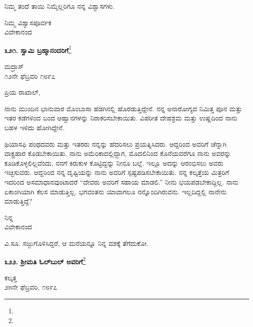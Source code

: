 ನಿಮ್ಮ ತಂದೆ ತಾಯಿ\enginline{-} ನಿಮ್ಮೆಲ್ಲರಿಗೂ ನನ್ನ ವಿಶ್ವಾಸಗಳು.

\vspace{-0.5cm}

{\flushright
ನಿಮ್ಮ ವಿಶ್ವಾಸಪೂರ್ವಕ\\ವಿವೇಕಾನಂದ\par}

\begin{center}
\textbf{೩೨೧. ಸ್ವಾಮಿ ಬ್ರಹ್ಮಾನಂದರಿಗೆ}\footnote{}
\end{center}

\vspace{-0.5cm}

\begin{flushright}
ಮದ್ರಾಸ್\\೧೨ನೇ ಫೆಬ್ರವರಿ ೧೮೯೭
\end{flushright}

\noindent
ಪ್ರಿಯ ರಾಖಾಲ್,

ನಾನು ಮುಂದಿನ ಭಾನುವಾರ  ಮೊಂಬಾಸಾ ಹಡಗಿನಲ್ಲಿ ಹೊರಡುತ್ತಿದ್ದೇನೆ. ನನ್ನ ಅನಾರೋಗ್ಯದ ನಿಮಿತ್ತ ಪೂನ ಮತ್ತು ಇತರ ಕಡೆಗಳಿಂದ ಬಂದ ಆಹ್ವಾನಗಳನ್ನು ನಿರಾಕರಿಸಬೇಕಾಯಿತು. ವಿಪರೀತ ದೇಹಶ್ರಮ ಮತ್ತು ಉಷ್ಣದಿಂದ ನಾನು ಬಹಳ ಇಳಿದು ಹೋಗಿದ್ದೇನೆ.

ಥಿಯಾಸಫಿ ಪಂಥದವರು ಮತ್ತು ಇತರರು ನನ್ನನ್ನು ಹೆದರಿಸಲು ಪ್ರಯತ್ನಿಸಿದರು. ಆದ್ದರಿಂದ ಅವರಿಗೆ ಚೆನ್ನಾಗಿ ವಾಕ್ಪ್ರಹಾರ ಕೊಡಬೇಕಾಯಿತು. ನಾನು ಅಮೆರಿಕಾದಲ್ಲಿದ್ದಾಗ, ಮೊದಲಿನಿಂದ ಕೊನೆಯವರೆಗೂ ನಾನು ಅವರನ್ನು ಕೂಡಿಕೊಳ್ಳಲಿಲ್ಲವೆಂದು, ನನಗೆ ಕಿರುಕುಳ ಕೊಟ್ಟಿದ್ದನ್ನು ನೀನೂ ಬಲ್ಲೆ. ಇಲ್ಲೂ ಅದನ್ನು ಆರಂಭಿಸಲು ಅವರು ಇಚ್ಛಿಸುವರು. ಆದ್ದರಿಂದ ನನ್ನ ದೃಷ್ಟಿಯನ್ನು ನಾನು ಅವರಿಗೆ ಸ್ಪಷ್ಟಪಡಿಸಬೇಕಾಯಿತು. ನನ್ನ ಕಲ್ಕತ್ತೆಯ ಮಿತ್ರರಿಗೆ ಇದರಿಂದ ಅಸಮಾಧಾನವುಂಟಾದರೆ “ದೇವರು ಅವರಿಗೆ ಸಹಾಯ ಮಾಡಲಿ.” ನೀನು ಭಯಪಡಬೇಕಾದ್ದಿಲ್ಲ. ನಾನು ಏಕಾಂಗಿಯಾಗಿ ಕೆಲಸ ಮಾಡುತ್ತಿಲ್ಲ. ಭಗವಂತನು ಯಾವಾಗಲೂ ನನ್ನೊಂದಿಗಿರುವನು. ಇಲ್ಲದಿದ್ದಲ್ಲಿ ನಾನೇನು ಮಾಡುತ್ತಿದ್ದೆ?

\vspace{-0.5cm}

{\flushright
ನಿನ್ನ\\ವಿವೇಕಾನಂದ\par}

ವಿ.ಸೂ.\enginline{-} ಸಜ್ಜುಗೊಳಿಸಿದ್ದರೆ, ಆ ಮನೆಯನ್ನೂ ನಿನ್ನ ವಶಕ್ಕೆ ತೆಗೆದುಕೋ.

\begin{center}
\textbf{೩೨೨. ಶ‍್ರೀಮತಿ ಓಲ್‌ಬುಲ್ ಅವರಿಗೆ}\footnote{}
\end{center}

\begin{flushright}
ಕಲ್ಕತ್ತ\\೨೫ನೇ ಫೆಬ್ರವರಿ, ೧೮೯೭
\end{flushright}

